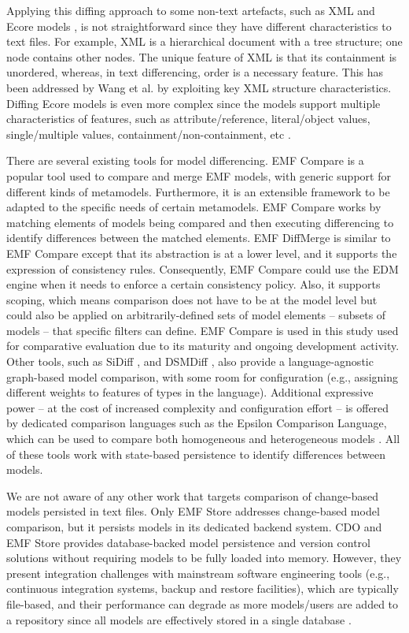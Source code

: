 Applying this diffing approach to some non-text artefacts, such as XML \cite{w3c-xml} and Ecore models \cite{steinberg2008emf}, is not straightforward since they have different characteristics to text files. For example, XML is a hierarchical document with a tree structure; one node contains other nodes. The unique feature of XML is that its containment is unordered, whereas, in text differencing, order is a necessary feature. This has been addressed by Wang et al. \cite{wang2003xdiff} by exploiting key XML  structure characteristics. Diffing Ecore models is even more complex since the models support multiple characteristics of features, such as attribute/reference, literal/object values, single/multiple values, containment/non-containment, etc \cite{steinberg2008emf}. 

There are several existing tools for model differencing. EMF Compare \cite{emfcompare2018developer} is a popular tool used to compare and merge EMF models, with generic support for different kinds of metamodels. Furthermore, it is an extensible framework to be adapted to the specific needs of certain metamodels. EMF Compare works by matching elements of models being compared and then executing differencing to identify differences between the matched elements. EMF DiffMerge \cite{eclipse2019emfdiffmerge} is similar to EMF Compare except that its abstraction is at a lower level, and it supports the expression of consistency rules. Consequently, EMF Compare could use the EDM engine when it needs to enforce a certain consistency policy. Also, it supports scoping, which means comparison does not have to be at the model level but could also be applied on arbitrarily-defined sets of model elements -- subsets of models -- that specific filters can define. EMF Compare is used in this study used for comparative evaluation due to its maturity and ongoing development activity. Other tools, such as SiDiff \cite{Treude2007SiDiff}, and DSMDiff \cite{lin2009dsmdiff}, also provide a language-agnostic graph-based model comparison, with some room for configuration (e.g., assigning different weights to features of types in the language). Additional expressive power -- at the cost of increased complexity and configuration effort -- is offered by dedicated comparison languages such as the Epsilon Comparison Language, which can be used to compare both homogeneous and heterogeneous models \cite{kolovos2009ecl}. All of these tools work with state-based persistence to identify differences between models.

We are not aware of any other work that targets comparison of change-based models persisted in text files. Only EMF Store \cite{koegel2010emfstore}  addresses change-based model comparison, but it persists models in its dedicated backend system. CDO \cite{eclipse2019cdo} and EMF Store provides database-backed model persistence and version control solutions without requiring models to be fully loaded into memory. However, they present integration challenges with mainstream software engineering tools (e.g., continuous integration systems, backup and restore facilities), which are typically file-based, and their performance can degrade as more models/users are added to a repository since all models are effectively stored in a single database \cite{KolovosRMPGCLRV13}. 

